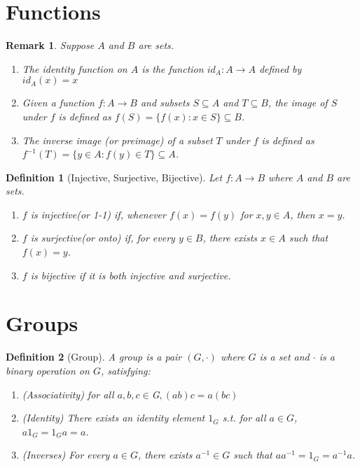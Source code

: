 \documentclass[12pt]{article}
\newtheorem{definition}{Definition}[section]
\newtheorem{remark}{Remark}[section]
\begin{document}
\section{Functions}

\begin{remark}
    Suppose $A$ and $B$ are sets.
    \begin{enumerate}
        \item The identity function on $A$ is the function $id_A : A \to A$ defined by $id_A(x) = x$
        \item Given a function $f : A \to B$ and subsets $S \subseteq A$ and $T \subseteq B$, the image of $S$ under $f$ is defined as $f(S) = \{ f(x) : x \in S \} \subseteq B$.
        \item The inverse image (or preimage) of a subset $T$ under $f$ is defined as $f^{-1}(T) = \{ y \in A : f(y) \in T \} \subseteq A$.
    \end{enumerate}
\end{remark}

\begin{definition}[Injective, Surjective, Bijective]
Let $f : A \to B$ where $A$ and $B$ are sets.
\begin{enumerate}
    \item $f$ is \emph{injective}(or 1-1) if, whenever $f(x) = f(y)$ for $x, y \in A$, then $x = y$.
    \item $f$ is \emph{surjective}(or onto) if, for every $y \in B$, there exists $x \in A$ such that $f(x) = y$.
    \item $f$ is \emph{bijective} if it is both injective and surjective.
\end{enumerate}
\end{definition}

\section{Groups}

\begin{definition}[Group]
A \emph{group} is a pair $(G, \cdot)$ where $G$ is a set  and $\cdot$ is a binary operation on $G$, satisfying:
\begin{enumerate}
    \item (Associativity) for all $a,b,c \in $G$, (ab)c = a(bc)$ 
    \item (Identity) There exists an identity element $1_G$ s.t. for all $a \in G$, $a1_G = 1_G a = a$.
    \item (Inverses) For every $a \in G$, there exists $a^{-1} \in G$ such that $aa^{-1} = 1_G = a^{-1}a$.
\end{enumerate}
\end{definition}
\end{document}
